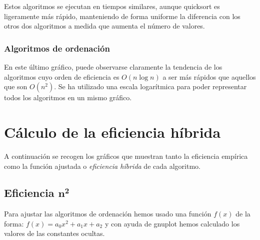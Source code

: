 \documentclass[11pt]{article}
\begin{document}
\begin{adjustbox}{center}
	
\end{adjustbox}

Estos algoritmos se ejecutan en tiempos similares, aunque quicksort es ligeramente más rápido, manteniendo de forma uniforme la diferencia con los otros dos algoritmos a medida que aumenta el número de valores.

\subsubsection*{Algoritmos de ordenación}

\begin{adjustbox}{center}
	
\end{adjustbox}

En este último gráfico, puede observarse claramente la tendencia de los algoritmos cuyo orden de eficiencia es $O(n\log n)$ a ser más rápidos que aquellos que son $O(n^2)$. Se ha utilizado una escala logarítmica para poder representar todos los algoritmos en un mismo gráfico.

\newpage



\section*{Cálculo de la eficiencia híbrida}
A continuación se recogen los gráficos que muestran tanto la eficiencia empírica como la función ajustada o \textit{eficiencia híbrida} de cada algoritmo.



\subsection*{Eficiencia $\boldsymbol{n^2}$}

Para ajustar las algoritmos de ordenación hemos usado una función $f(x)$ de la forma: $f(x) = a_0x^2 + a_1x + a_2$ y con ayuda de gnuplot hemos calculado los valores de las constantes ocultas. 

\begin{center}
	
\end{center}

\begin{center}
	
\end{center}

\begin{center}
	
\end{center}
\end{document}

